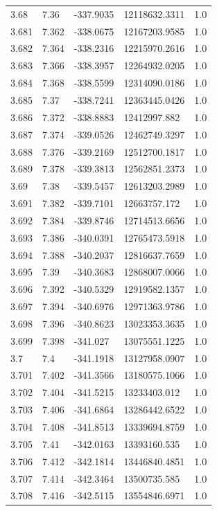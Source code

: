 \begin{tabular}{lllll}
3.68 & 7.36 & -337.9035 & 12118632.3311 & 1.0 \\
3.681 & 7.362 & -338.0675 & 12167203.9585 & 1.0 \\
3.682 & 7.364 & -338.2316 & 12215970.2616 & 1.0 \\
3.683 & 7.366 & -338.3957 & 12264932.0205 & 1.0 \\
3.684 & 7.368 & -338.5599 & 12314090.0186 & 1.0 \\
3.685 & 7.37 & -338.7241 & 12363445.0426 & 1.0 \\
3.686 & 7.372 & -338.8883 & 12412997.882 & 1.0 \\
3.687 & 7.374 & -339.0526 & 12462749.3297 & 1.0 \\
3.688 & 7.376 & -339.2169 & 12512700.1817 & 1.0 \\
3.689 & 7.378 & -339.3813 & 12562851.2373 & 1.0 \\
3.69 & 7.38 & -339.5457 & 12613203.2989 & 1.0 \\
3.691 & 7.382 & -339.7101 & 12663757.172 & 1.0 \\
3.692 & 7.384 & -339.8746 & 12714513.6656 & 1.0 \\
3.693 & 7.386 & -340.0391 & 12765473.5918 & 1.0 \\
3.694 & 7.388 & -340.2037 & 12816637.7659 & 1.0 \\
3.695 & 7.39 & -340.3683 & 12868007.0066 & 1.0 \\
3.696 & 7.392 & -340.5329 & 12919582.1357 & 1.0 \\
3.697 & 7.394 & -340.6976 & 12971363.9786 & 1.0 \\
3.698 & 7.396 & -340.8623 & 13023353.3635 & 1.0 \\
3.699 & 7.398 & -341.027 & 13075551.1225 & 1.0 \\
3.7 & 7.4 & -341.1918 & 13127958.0907 & 1.0 \\
3.701 & 7.402 & -341.3566 & 13180575.1066 & 1.0 \\
3.702 & 7.404 & -341.5215 & 13233403.012 & 1.0 \\
3.703 & 7.406 & -341.6864 & 13286442.6522 & 1.0 \\
3.704 & 7.408 & -341.8513 & 13339694.8759 & 1.0 \\
3.705 & 7.41 & -342.0163 & 13393160.535 & 1.0 \\
3.706 & 7.412 & -342.1814 & 13446840.4851 & 1.0 \\
3.707 & 7.414 & -342.3464 & 13500735.585 & 1.0 \\
3.708 & 7.416 & -342.5115 & 13554846.6971 & 1.0 \\

\end{tabular}
